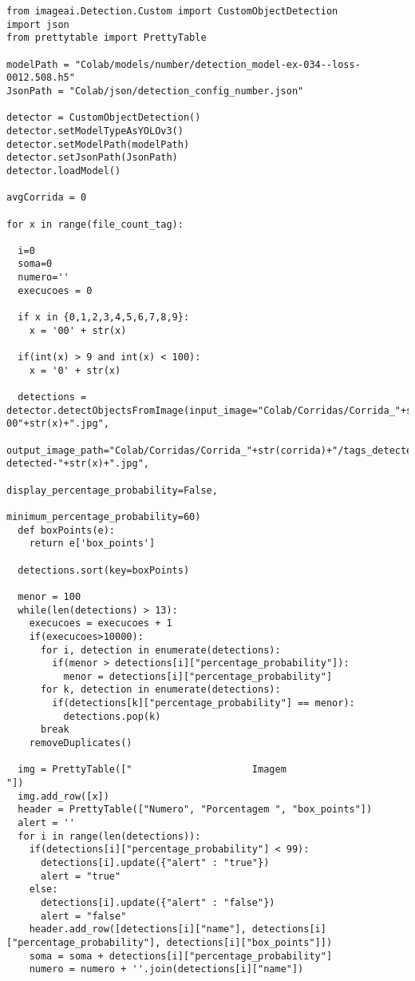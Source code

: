 
\begin{lstlisting}[caption=Identificando os números nas imagens com \textit{barcodes} individuais]
from imageai.Detection.Custom import CustomObjectDetection
import json
from prettytable import PrettyTable

modelPath = "Colab/models/number/detection_model-ex-034--loss-0012.508.h5"
JsonPath = "Colab/json/detection_config_number.json"

detector = CustomObjectDetection()
detector.setModelTypeAsYOLOv3()
detector.setModelPath(modelPath)
detector.setJsonPath(JsonPath)
detector.loadModel()

avgCorrida = 0

for x in range(file_count_tag):

  i=0
  soma=0
  numero=''
  execucoes = 0

  if x in {0,1,2,3,4,5,6,7,8,9}:
    x = '00' + str(x)
  
  if(int(x) > 9 and int(x) < 100):
    x = '0' + str(x)

  detections = detector.detectObjectsFromImage(input_image="Colab/Corridas/Corrida_"+str(corrida)+"/tags_images/barcode-00"+str(x)+".jpg", 
                                          output_image_path="Colab/Corridas/Corrida_"+str(corrida)+"/tags_detected/digit-detected-"+str(x)+".jpg", 
                                          display_percentage_probability=False, 
                                          minimum_percentage_probability=60)
  def boxPoints(e):
    return e['box_points']

  detections.sort(key=boxPoints)

  menor = 100
  while(len(detections) > 13):
    execucoes = execucoes + 1
    if(execucoes>10000):
      for i, detection in enumerate(detections):
        if(menor > detections[i]["percentage_probability"]):
          menor = detections[i]["percentage_probability"]   
      for k, detection in enumerate(detections):
        if(detections[k]["percentage_probability"] == menor):
          detections.pop(k)
      break
    removeDuplicates()

  img = PrettyTable(["                     Imagem                    "])
  img.add_row([x])
  header = PrettyTable(["Numero", "Porcentagem ", "box_points"])
  alert = ''
  for i in range(len(detections)):
    if(detections[i]["percentage_probability"] < 99):
      detections[i].update({"alert" : "true"})
      alert = "true"
    else:
      detections[i].update({"alert" : "false"})
      alert = "false"
    header.add_row([detections[i]["name"], detections[i]["percentage_probability"], detections[i]["box_points"]])
    soma = soma + detections[i]["percentage_probability"]
    numero = numero + ''.join(detections[i]["name"])


\end{lstlisting}

